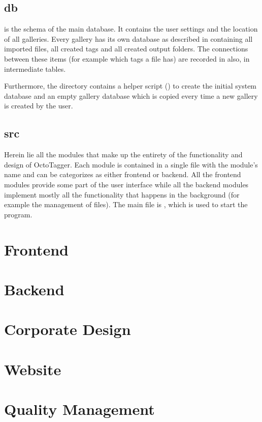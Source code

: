 \subsection{db}
 is the schema of the main database. It contains the user
settings and the location of all galleries. Every gallery has its own
database as described in  containing all imported files,
all created tags and all created output folders. The connections between these
items (for example which tags a file has) are recorded in also,
in intermediate tables.

Furthermore, the directory contains a helper script () to create the initial
system database and an empty gallery database which is copied every time a new
gallery is created by the user.

\subsection{src}
Herein lie all the modules that make up the entirety of the functionality and
design of OctoTagger. Each module is contained in a single file with the
module's name and can be categorizes as either frontend or backend. All the
frontend modules provide some part of the user interface while all the backend
modules implement mostly all the functionality that happens in the background
(for example the management of files). The main file is , 
which is used to start the program.


\section{Frontend}
%
\section{Backend}
%

\section{Corporate Design}
%
\section{Website}
%

\section{Quality Management}
\def \kapitelautor {Julian Lorenz}
